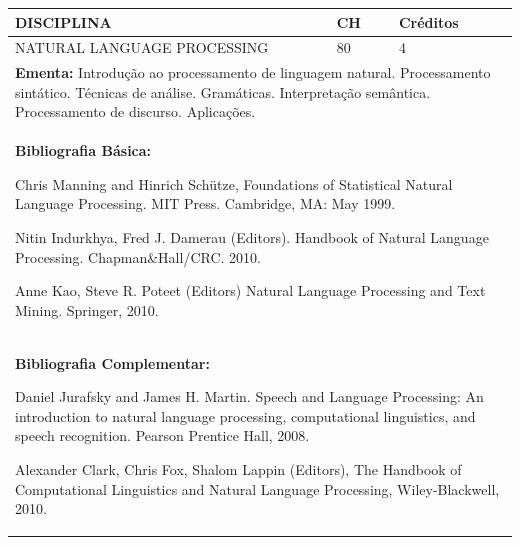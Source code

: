 \documentclass[a4paper, 12pt, openright, oneside, german, french, english, brazil]{abntex2}
\begin{document}
\begin{table}[!h]
  \footnotesize
  \centering
  \begin{tabular}{|p{100mm}|p{10mm}|p{20mm}|}
    \hline
    \textbf{DISCIPLINA} & \textbf{CH} & \textbf{Créditos} \\
    \hline
    NATURAL LANGUAGE PROCESSING & 80 & 4 \\
    \hline
    \multicolumn{3}{|p{130mm}|}{\textbf{Ementa:}  Introdução ao processamento de linguagem natural. Processamento sintático. Técnicas de análise. Gramáticas. Interpretação semântica. Processamento de discurso. Aplicações.} \\
    \hline
    \multicolumn{3}{|p{130mm}|}{\textbf{Bibliografia Básica:}

    Chris Manning and Hinrich Schütze, Foundations of Statistical Natural Language Processing. MIT Press. Cambridge, MA: May 1999.

Nitin Indurkhya, Fred J. Damerau (Editors). Handbook of Natural Language Processing. Chapman\&Hall/CRC. 2010.

Anne Kao, Steve R. Poteet (Editors) Natural Language Processing and Text Mining. Springer, 2010.
} \\
    \hline
    \multicolumn{3}{|p{130mm}|}{\textbf{Bibliografia Complementar:}

    Daniel Jurafsky and James H. Martin. Speech and Language Processing: An introduction to natural language processing, computational linguistics, and speech recognition. Pearson Prentice Hall, 2008.

Alexander Clark, Chris Fox, Shalom Lappin (Editors), The Handbook of Computational Linguistics and Natural Language Processing, Wiley-Blackwell, 2010.
} \\
    \hline
  \end{tabular}
\end{table}
\end{document}
